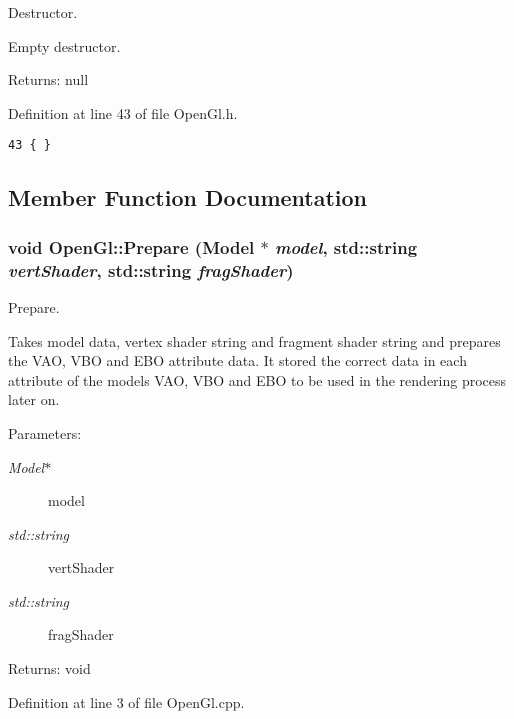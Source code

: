 Destructor. 

Empty destructor.

\begin{Desc}
\item[Returns:]null \end{Desc}


Definition at line 43 of file OpenGl.h.

\begin{Code}\begin{verbatim}43 { }
\end{verbatim}
\end{Code}




\subsection{Member Function Documentation}
\hypertarget{class_open_gl_d8259307bc0b851348b7afaa46965473}{
\subsubsection[Prepare]{\setlength{\rightskip}{0pt plus 5cm}void OpenGl::Prepare ({\bf Model} $\ast$ {\em model}, \/  std::string {\em vertShader}, \/  std::string {\em fragShader})}}
\label{class_open_gl_d8259307bc0b851348b7afaa46965473}


Prepare. 

Takes model data, vertex shader string and fragment shader string and prepares the VAO, VBO and EBO attribute data. It stored the correct data in each attribute of the models VAO, VBO and EBO to be used in the rendering process later on.

\begin{Desc}
\item[Parameters:]
\begin{description}
\item[{\em Model$\ast$}]model \item[{\em std::string}]vertShader \item[{\em std::string}]fragShader \end{description}
\end{Desc}
\begin{Desc}
\item[Returns:]void \end{Desc}


Definition at line 3 of file OpenGl.cpp.

